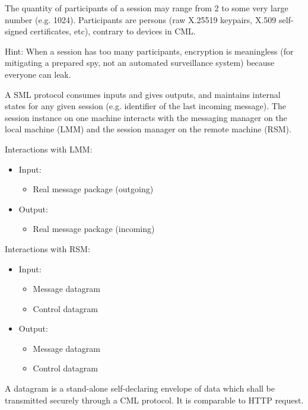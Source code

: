 \documentclass[a4paper,11pt]{article}
\begin{document}
The quantity of participants of a session may range from 2 to some very large number (e.g. 1024).
Participants are persons (raw X.25519 keypairs, X.509 self-signed certificates, etc),
contrary to devices in CML.

Hint: When a session has too many participants, encryption is meaningless
(for mitigating a prepared spy, not an automated surveillance system) because everyone can leak.

A SML protocol consumes inputs and gives outputs,
and maintains internal states for any given session (e.g. identifier of the last incoming message).
The session instance on one machine interacts with the messaging manager on the local machine (LMM)
and the session manager on the remote machine (RSM).

Interactions with LMM:

\begin{itemize}
	\item Input:
	      \begin{itemize}
		      \item Real message package (outgoing)
	      \end{itemize}
	\item Output:
	      \begin{itemize}
		      \item Real message package (incoming)
	      \end{itemize}
\end{itemize}

Interactions with RSM:

\begin{itemize}
	\item Input:
	      \begin{itemize}
		      \item Message datagram
		      \item Control datagram
	      \end{itemize}
	\item Output:
	      \begin{itemize}
		      \item Message datagram
		      \item Control datagram
	      \end{itemize}
\end{itemize}

A datagram is a stand-alone self-declaring envelope of data which shall be transmitted securely through a CML protocol.
It is comparable to HTTP request.
\end{document}
